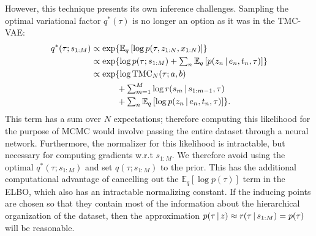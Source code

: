 However, this technique presents its own inference challenges.
Sampling the optimal variational factor $q^*(\tau)$
is no longer an option as it was in the TMC-VAE:
\begin{equation}
\begin{split}
    q^*(\tau; s_{1:M}) 
    &\textstyle\propto \exp{\E_q\left[\log p(\tau, z_{1:N}, x_{1:N})\right]} \\
    &\textstyle\propto \exp{\log p(\tau ; s_{1:M}) + \sum_n \E_q\left[p(z_n \given e_n, t_n, \tau)\right]} \\
    &\textstyle\propto \exp{\log \mathrm{TMC}_N(\tau; a, b)
    \\ &\textstyle\qquad\quad + \sum_{m = 1}^M \log r(s_m \given s_{1:m - 1}, \tau)
    \\ &\textstyle\qquad\quad + \sum_n \E_q\left[\log p(z_n \given e_n, t_n, \tau)\right]}.
\end{split}
\end{equation}
This term has a sum over $N$ expectations; therefore computing this likelihood
for the purpose of MCMC
would involve passing the entire dataset through a neural network.
Furthermore, the normalizer for this likelihood is intractable,
but necessary for computing gradients w.r.t $s_{1:M}$.
We therefore avoid using the optimal $q^*(\tau; s_{1:M})$
and set
$q(\tau; s_{1:M})$ to the prior.
This has the additional computational advantage of cancelling out
the $\mathbb{E}_q[\log p(\tau)]$ term in the ELBO, which also has an intractable normalizing constant.
If the inducing points are chosen so that they contain most of the information about the hierarchical organization of the dataset, then the approximation $p(\tau \,|\, z)\approx r(\tau \,|\, s_{1:M})=p(\tau)$ will be reasonable.

